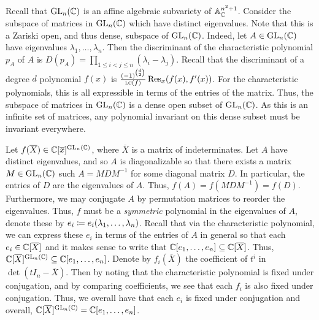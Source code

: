 \documentclass[letterpaper, 11pt, oneside]{book}
\begin{document}
\begin{sol}
  Recall that $\operatorname{GL}_{n}(\mathbb{C})$ is an affine algebraic subvariety of $\mathbb{A}_{\mathbb{C}}^{n^{2} + 1}$.
  Consider the subspace of matrices in $\operatorname{GL}_{n}(\mathbb{C})$ which have distinct eigenvalues.
  Note that this is a Zariski open, and thus dense, subspace of $\operatorname{GL}_{n}(\mathbb{C})$.
  Indeed, let $A \in \operatorname{GL}_{n}(\mathbb{C})$ have eigenvalues $\lambda_{1}, \ldots, \lambda_{n}$.
  Then the discriminant of the characteristic polynomial $p_{A}$ of $A$ is $D(p_{A}) = \prod_{1 \leq i < j \leq n} (\lambda_{i} - \lambda_{j})$.
  Recall that the discriminant of a degree $d$ polynomial $f(x)$ is $\frac{(-1)^{\binom{d}{2}}}{\lc(f)} \Res_{x}(f(x), f'(x))$.
  For the characteristic polynomials, this is all expressible in terms of the entries of the matrix.
  Thus, the subspace of matrices in $\operatorname{GL}_{n}(\mathbb{C})$ is a dense open subset of $\operatorname{GL}_{n}(\mathbb{C})$.
  As this is an infinite set of matrices, any polynomial invariant on this dense subset must be invariant everywhere.

  Let $f(\overline{X}) \in \mathbb{C}[\overline{x}]^{\operatorname{GL}_{n}(\mathbb{C})}$, where $\overline{X}$ is a matrix of indeterminates.
  Let $A$ have distinct eigenvalues, and so $A$ is diagonalizable so that there exists a matrix $M \in \operatorname{GL}_{n}(\mathbb{C})$ such $A = MDM^{-1}$ for some diagonal matrix $D$.
  In particular, the entries of $D$ are the eigenvalues of $A$.
  Thus, $f(A) = f(MDM^{-1}) = f(D)$.
  Furthermore, we may conjugate $A$ by permutation matrices to reorder the eigenvalues.
  Thus, $f$ must be a \emph{symmetric} polynomial in the eigenvalues of $A$, denote these by $e_{i} \coloneqq e_{i}(\lambda_{1}, \ldots, \lambda_{n})$.
  Recall that via the characteristic polynomial, we can express these $e_{i}$ in terms of the entries of $A$ in general so that each $e_{i} \in \mathbb{C}[\overline{X}]$ and it makes sense to write that $\mathbb{C}[e_{1}, \ldots, e_{n}] \subseteq \mathbb{C}[\overline{X}]$.
  Thus, $\mathbb{C}[\overline{X}]^{\operatorname{GL}_{n}(\mathbb{C})} \subseteq \mathbb{C}[e_{1}, \ldots, e_{n}]$.
  Denote by $f_{i}(\overline{X})$ the coefficient of $t^{i}$ in $\det(tI_{n} - \overline{X})$.
  Then by noting that the characteristic polynomial is fixed under conjugation, and by comparing coefficients, we see that each $f_{i}$ is also fixed under conjugation.
  Thus, we overall have that each $e_{i}$ is fixed under conjugation and overall, $\mathbb{C}[\overline{X}]^{\operatorname{GL}_{n}(\mathbb{C})} = \mathbb{C}[e_{1}, \ldots, e_{n}]$.
\end{sol}

\printbibliography
\end{document}
